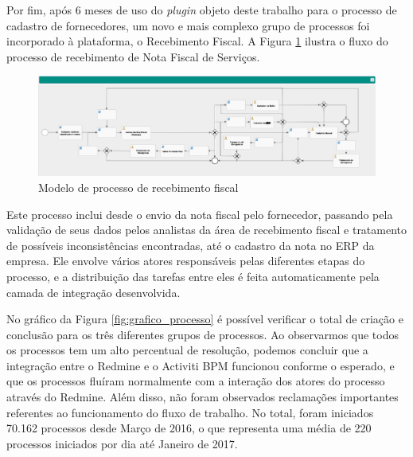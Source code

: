 Por fim, após 6 meses de uso do \textit{plugin} objeto deste trabalho para o processo de cadastro de fornecedores, um novo e mais complexo grupo de processos foi incorporado à plataforma, o Recebimento Fiscal. A Figura \ref{fig:processo_recebimento_fiscal} ilustra o fluxo do processo de recebimento de Nota Fiscal de Serviços.

\begin{figure}[H]
\centering
\includegraphics[width=1\textwidth]{imagens/processo_recebimento_fiscal.png}
\caption{Modelo de processo de recebimento fiscal}
\label{fig:processo_recebimento_fiscal}
\end{figure}

Este processo inclui desde o envio da nota fiscal pelo fornecedor, passando pela validação de seus dados pelos analistas da área de recebimento fiscal e tratamento de possíveis inconsistências encontradas, até o cadastro da nota no ERP da empresa. Ele envolve vários atores responsáveis pelas diferentes etapas do processo, e a distribuição das tarefas entre eles é feita automaticamente pela camada de integração desenvolvida.

No gráfico da Figura \ref{fig:grafico_processo} é possível verificar o total de criação e conclusão para os três diferentes grupos de processos. Ao observarmos que todos os processos tem um alto percentual de resolução, podemos concluir que a integração entre o Redmine e o Activiti BPM funcionou conforme o esperado, e que os processos fluíram normalmente com a interação dos atores do processo através do Redmine. Além disso, não foram observados reclamações importantes referentes ao funcionamento do fluxo de trabalho. No total, foram iniciados 70.162 processos desde Março de 2016, o que representa uma média de 220 processos iniciados por dia até Janeiro de 2017.

